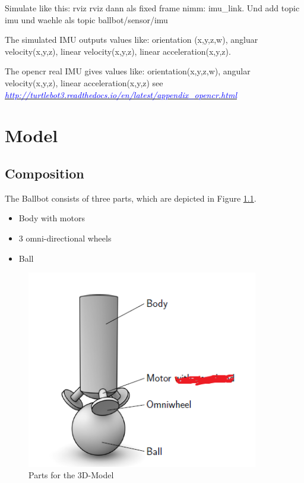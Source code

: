 \documentclass[twoside,colorback,accentcolor=tud4c,11pt]{tudreport}
\newcommand{\mylink}[2] {	\hyperlink{#1}{	\textit{\textcolor{blue}{#2}}}}
\begin{document}
	Simulate like this:
	rviz rviz dann als fixed frame nimm: imu\_link. Und add topic imu und waehle als topic ballbot/sensor/imu
	
	The simulated IMU outputs values like: orientation (x,y,z,w), angluar velocity(x,y,z), linear velocity(x,y,z), linear acceleration(x,y,z).
	
	The opencr real IMU gives values like: orientation(x,y,z,w), angular velocity(x,y,z), linear acceleration(x,y,z) see \mylink{OpenCR board IMU }{http://turtlebot3.readthedocs.io/en/latest/appendix\_opencr.html}
	
	\chapter{Model}
	
	\section{Composition}
	The Ballbot consists of three parts, which are depicted in Figure \ref{fig:Structure}.
	
	\begin{itemize}
		\item Body with motors
		\item 3 omni-directional wheels
		\item Ball
	\end{itemize}
	
	
	\begin{figure}[htbp]
		\centering
		\includegraphics[width=0.9\textwidth]{img/Strucuture.PNG}
		\caption{Parts for the 3D-Model}
		\label{fig:Structure}
	\end{figure}
	
\end{document}
